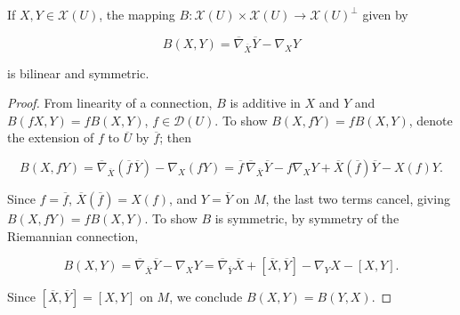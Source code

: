 \begin{proposition}
  \label{prop:dc-ch6-2-1}


  If $X,Y\in\mathcal{X}(U)$, the mapping
  $B:\mathcal{X}(U)\times\mathcal{X}(U)\to\mathcal{X}(U)^\perp$ given by

  $$
  B(X,Y)=\overline{\nabla}_{\overline{X}}\overline{Y}-\nabla_X Y
  $$

  is bilinear and symmetric.
\end{proposition}
\begin{proof}

  \sketch
  From linearity of a connection, $B$ is additive in $X$ and $Y$ and
  $B(fX,Y)=fB(X,Y)$, $f\in\mathcal{D}(U)$. To show $B(X,fY)=fB(X,Y)$, denote the
  extension of $f$ to $\overline{U}$ by $\overline{f}$; then

  $$
  B(X,fY)=\overline{\nabla}_{\overline{X}}(\overline{f}\,\overline{Y})-\nabla_X(fY)=\overline{f}\,\overline{\nabla}_{\overline{X}}\overline{Y}-f\nabla_X Y+\overline{X}(\overline{f})\overline{Y}-X(f)Y.
  $$

  Since $f=\overline{f}$, $\overline{X}(\overline{f})=X(f)$, and $Y=\overline{Y}$ on
  $M$, the last two terms cancel, giving $B(X,fY)=fB(X,Y)$. To show $B$ is
  symmetric, by symmetry of the Riemannian connection,

  $$
  B(X,Y)=\overline{\nabla}_{\overline{X}}\overline{Y}-\nabla_X Y=\overline{\nabla}_{\overline{Y}}\overline{X}+[\overline{X},\overline{Y}]-\nabla_Y X-[X,Y].
  $$

  Since $[\overline{X},\overline{Y}]=[X,Y]$ on $M$, we conclude $B(X,Y)=B(Y,X)$.
\end{proof}

